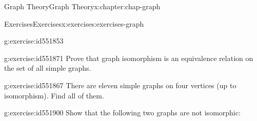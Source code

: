 \documentclass[oneside,10pt,]{book}
\numberwithin{equation}{section}
\begin{document}
\begin{chapterptx}{Graph Theory}{}{Graph Theory}{}{}{x:chapter:chap-graph}
\begin{exercises-section}{Exercises}{}{Exercises}{}{}{x:exercises:exercises-graph}
\begin{divisionexercise}{13}{}{}{g:exercise:id551853}
\begin{sidebyside}{3}{0.0366666666666667}{0.0366666666666667}{0.0733333333333333}
\begin{sbspanel}{0.25}
{
}%
\end{sbspanel}%
\end{sidebyside}%
\end{divisionexercise}%
\begin{divisionexercise}{14}{}{}{g:exercise:id551871}%
Prove that graph isomorphism is an equivalence relation on the set of all simple graphs.%
\end{divisionexercise}%
\begin{divisionexercise}{15}{}{}{g:exercise:id551867}%
There are eleven simple graphs on four vertices (up to isomorphism). Find all of them.%
\end{divisionexercise}%
\begin{divisionexercise}{16}{}{}{g:exercise:id551900}%
Show that the following two graphs are not isomorphic:%
\begin{sidebyside}{2}{0.3}{0.3}{0.06}%
\begin{sbspanel}{0.17}%
\end{sbspanel}
\end{sidebyside}
\end{divisionexercise}
\end{exercises-section}
\end{chapterptx}
\end{document}
